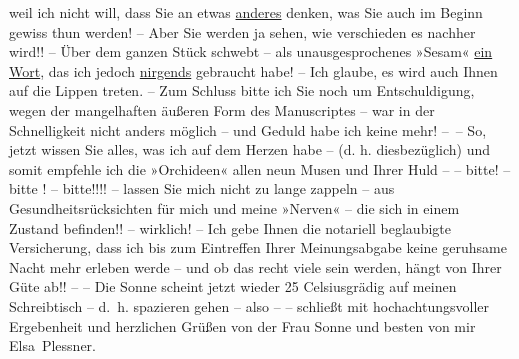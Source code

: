                weil ich nicht will, dass Sie an etwas \uline{anderes} denken,
               was Sie auch im Beginn gewiss thun werden! – Aber Sie werden ja sehen, wie
               verschieden es nachher wird!! – Über dem ganzen Stück schwebt – als unausgesprochenes »Sesam« \uline{ein Wort}, das ich jedoch \uline{nirgends} gebraucht habe! – Ich glaube, es wird auch {\pb}Ihnen auf die Lippen treten. – Zum Schluss bitte ich Sie
               noch um Entschuldigung, wegen der mangelhaften äußeren Form des Manuscriptes – war in der Schnelligkeit
               nicht anders möglich – und Geduld habe ich keine mehr! – – So, jetzt wissen Sie alles,
               was ich auf dem Herzen habe – (d. h. diesbezüglich) und somit empfehle ich die »Orchideen« allen neun Musen und Ihrer Huld – –
               bitte! – bitte ! – bitte!!!! – lassen Sie mich nicht zu lange zappeln – aus
               Gesundheitsrücksichten für mich und meine »Nerven« – die sich in einem \label{K_L03710-3v}\label{K_L03710-3}
               Zustand befinden!! – wirklich! – Ich gebe Ihnen die notariell beglaubigte
               Versicherung, dass ich bis zum Eintreffen Ihrer Meinungsabgabe keine geruhsame Nacht
               mehr erleben werde – und ob das recht viele sein werden, hängt von Ihrer Güte ab!! –
               – Die Sonne scheint jetzt wieder 25 Celsiusgrädig auf meinen Schreibtisch – d. h.
               spazieren gehen – also – – schließt mit hochachtungsvoller Ergebenheit und herzlichen
               Grüßen von der Frau Sonne und besten von mir\pend
           \pstart \spacefill\mbox{Elsa Plessner.}\pend{}\endnumbering{}  \newcommand{\dateiname}{L03710}\newcommand{\titel}{Elsa Plessner an Arthur Schnitzler, 29. 12. 1896}\newcommand{\editorInnen}{Selma Jahnke und Martin Anton Müller}
